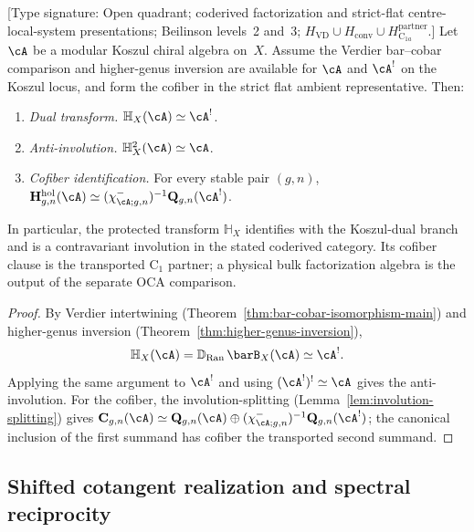 \begin{theorem}
\label{thm:holo-comp-bulk-reconstruction}
\textup{[Type signature: Open quadrant; coderived factorization and
strict-flat centre-local-system presentations; Beilinson levels~2
and~3; \(H_{\mathrm{VD}}\cup H_{\mathrm{conv}}\cup
H_{\mathrm C_{1a}}^{\mathrm{partner}}\).]}
Let $\cA$ be a modular Koszul chiral algebra on~$X$. Assume the
Verdier bar--cobar comparison and higher-genus inversion are available
for $\cA$ and $\cA^!$ on the Koszul locus, and form the cofiber in the
strict flat ambient representative. Then:
\begin{enumerate}[label=\textup{(\roman*)}]
\item \emph{Dual transform.}\;
 $\mathbb{H}_X(\cA) \simeq \cA^!$.
\item \emph{Anti-involution.}\;
 $\mathbb{H}_X^2(\cA) \simeq \cA$.
\item \emph{Cofiber identification.}\;
 For every stable pair \((g,n)\),
 $\mathbf{H}^{\mathrm{hol}}_{g,n}(\cA)\simeq
 (\chi^-_{\cA;g,n})^{-1}\mathbf{Q}_{g,n}(\cA^!)$.
\end{enumerate}
In particular, the protected transform $\mathbb{H}_X$ identifies
with the Koszul-dual branch and is a contravariant involution in the
stated coderived category.  Its cofiber clause is the transported
\(\mathrm C_1\) partner; a physical bulk factorization algebra is the
output of the separate OCA comparison.
\end{theorem}

\begin{proof}
By Verdier intertwining
(Theorem~\ref{thm:bar-cobar-isomorphism-main}) and higher-genus
inversion (Theorem~\ref{thm:higher-genus-inversion}),
\[
\mathbb{H}_X(\cA)
=
\mathbb{D}_{\operatorname{Ran}} \, \barB_X(\cA)
\simeq
\cA^!.
\]
Applying the same argument to $\cA^!$ and using
$(\cA^!)^! \simeq \cA$ gives the anti-involution. For the cofiber,
the involution-splitting (Lemma~\ref{lem:involution-splitting})
gives $\mathbf{C}_{g,n}(\cA)\simeq\mathbf{Q}_{g,n}(\cA)\oplus
(\chi^-_{\cA;g,n})^{-1}\mathbf{Q}_{g,n}(\cA^!)$; the canonical
inclusion of the first summand has cofiber the transported second
summand.
\end{proof}

\subsection{Shifted cotangent realization and spectral reciprocity}
\label{subsec:holo-comp-cotangent-spectral}

